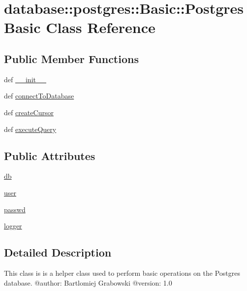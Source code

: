 \hypertarget{classdatabase_1_1postgres_1_1Basic_1_1PostgresBasic}{
\section{database::postgres::Basic::PostgresBasic Class Reference}
\label{classdatabase_1_1postgres_1_1Basic_1_1PostgresBasic}
}
\subsection*{Public Member Functions}
\begin{DoxyCompactItemize}
\item 
def \hyperlink{classdatabase_1_1postgres_1_1Basic_1_1PostgresBasic_a0c63793aa57f84cc529cd81dd4f107f7}{\_\-\_\-init\_\-\_\-}
\item 
def \hyperlink{classdatabase_1_1postgres_1_1Basic_1_1PostgresBasic_a5de8f4acfd24dccebf94a05d735bd397}{connectToDatabase}
\item 
def \hyperlink{classdatabase_1_1postgres_1_1Basic_1_1PostgresBasic_a8a483c39885798b1f233f90373010986}{createCursor}
\item 
def \hyperlink{classdatabase_1_1postgres_1_1Basic_1_1PostgresBasic_ac0921c1b31b0e241415cd9dfc3f20386}{executeQuery}
\end{DoxyCompactItemize}
\subsection*{Public Attributes}
\begin{DoxyCompactItemize}
\item 
\hyperlink{classdatabase_1_1postgres_1_1Basic_1_1PostgresBasic_ab3b6a0b3076a9500b5f327634e789294}{db}
\item 
\hyperlink{classdatabase_1_1postgres_1_1Basic_1_1PostgresBasic_ac62b73e044b650f2663895d2c782a93a}{user}
\item 
\hyperlink{classdatabase_1_1postgres_1_1Basic_1_1PostgresBasic_a65d13fc2cb11854e0d93c21b83d15e75}{passwd}
\item 
\hyperlink{classdatabase_1_1postgres_1_1Basic_1_1PostgresBasic_aa20ee940899a8083ae01761ea2ef3992}{logger}
\end{DoxyCompactItemize}


\subsection{Detailed Description}
\begin{DoxyVerb}
This class is is a helper class used to perform basic operations on the Postgres database.
@author: Bartlomiej Grabowski
@version: 1.0
\end{DoxyVerb}
 

